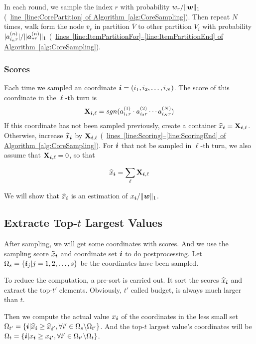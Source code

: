 \documentclass[letterpaper]{article}
\newcommand{\Sca}[3]{{#1}^{(#2)}_{i_#2#3}}%
\newcommand{\V}[1]{{\bm{{\MakeLowercase{#1}}}}}
\newcommand{\Vacol}[1]{\V{a}^{(#1)}_{*r}}
\newcommand{\M}[1]{{\bm{\mathbf{\MakeUppercase{#1}}}}}
\newcommand{\norm}[2]{\|#1\|_{#2}}
\newcommand{\AlgLine}[2]{\hyperref[alg:#1]{line~\ref*{line:#2} of Algorithm~\ref*{alg:#1}}}
\newcommand{\AlgLines}[3]{\hyperref[alg:#1]{lines~\ref*{line:#2}--\ref*{line:#3} of Algorithm~\ref*{alg:#1}}}
\newcommand{\Coord}{(i_1,i_2,\ldots,i_N)}
\begin{document}
In each round, we sample the index $r$ with probability $w_r/\norm{\V{w}}{1}$ (~\AlgLine{CoreSampling}{CorePartition}). Then repeat $N$ times, walk form the node $\overline{v}_r$ in partition $\overline{V}$ to other partition $V_i$ with probability $|\Sca{a}{n}{r}|/\norm{\Vacol{n}}{1}$ (~\AlgLines{CoreSampling}{ItemPartitionFor}{ItemPartitionEnd}).

\subsubsection{Scores}
Each time we sampled an coordinate $\V{i} = \Coord $. The score of this coordinate in the $\ell $-th turn is
\[
\M{X}_{\V{i},\ell}  = sgn(\Sca{a}{1}{r}\cdot\Sca{a}{2}{r}\cdots\Sca{a}{N}{r})
\]
If this coordinate has not been sampled previously, create a container $\widehat{x}_{\V{i}} = \M{X}_{\V{i},\ell}$. Otherwise, increase $\widehat{x}_{\V{i}}$ by $\M{X}_{\V{i},\ell}$ (~\AlgLines{CoreSampling}{Scoring}{ScoringEnd}). For $\V{i}$ that not be sampled in $\ell$-th turn, we also assume that $\M{X}_{\V{i},\ell}=0$, so that

\[
\widehat{x}_{\V{i}} = \sum_{\ell} \M{X}_{\V{i},\ell}
\]

We will show that $\widehat{x}_{\V{i}}$ is an estimation of $x_{\V{i}}/\norm{\V{w}}{1}$.
\subsection{Extracte Top-$t$ Largest Values}
After sampling, we will get some coordinates with scores.
And we use the sampling score $\widehat{x}_{\V{i}}$ and coordinate set $\V{i}$ to do postprocessing.
Let $\Omega_s = \{\V{i}_j|j = 1,2,\ldots,s\}$ be the coordinates have been sampled.

To reduce the computation, a pre-sort is carried out. It sort the scores $\widehat{x}_{\V{i}}$ and extract the top-$t'$ elements.
Obviously, $t'$ called budget, is always much larger than $t$.

Then we compute the actual value $x_{\V{i}}$ of the coordinates in the less small set $\Omega_{t'} = \{\V{i}|\widehat{x}_{\V{i}}\geq \widehat{x}_{\V{i'}},\forall i'\in \Omega_{s} \backslash \Omega_{t'}\}$. And the top-$t$ largest value's coordinates will be $\Omega_{t}=\{\V{i}|x_{\V{i}}\geq x_{\V{i'}},\forall i' \in \Omega_{t'} \backslash \Omega_{t} \}$.
\end{document}
